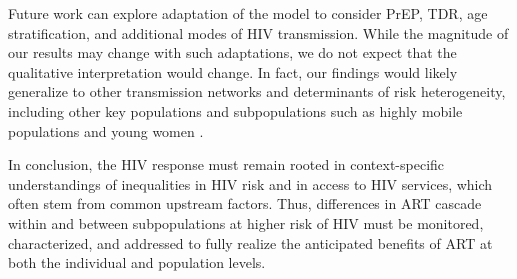 Future work can explore adaptation of the model to consider
PrEP, TDR, age stratification, and additional modes of HIV transmission.
While the magnitude of our results may change with such adaptations,
we do not expect that the qualitative interpretation would change.
In fact, our findings would likely generalize
to other transmission networks and determinants of risk heterogeneity,
including other key populations and subpopulations such as
highly mobile populations and young women \cite{Camlin2019,Cheuk2020}.
\par
In conclusion, the HIV response must remain rooted in
context-specific understandings of inequalities in HIV risk and in access to HIV services,
which often stem from common upstream factors.
Thus, differences in ART cascade within and between subpopulations at higher risk of HIV
must be monitored, characterized, and addressed
to fully realize the anticipated benefits of ART
at both the individual and population levels.
\enlargethispage{2ex} %
